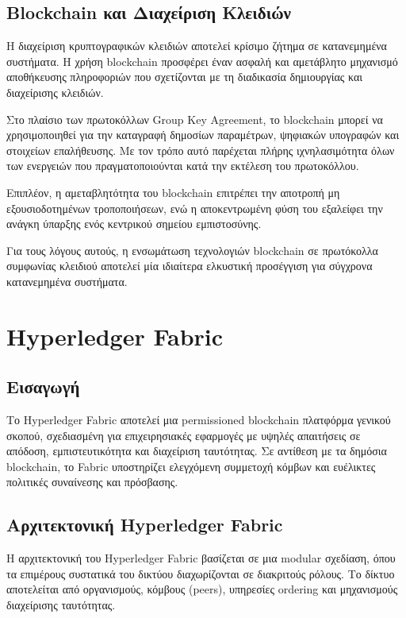 \documentclass[12pt,a4paper]{report}
\begin{document}
\section{Blockchain και Διαχείριση Κλειδιών}

Η διαχείριση κρυπτογραφικών κλειδιών αποτελεί κρίσιμο ζήτημα σε κατανεμημένα συστήματα. Η χρήση blockchain προσφέρει έναν ασφαλή και αμετάβλητο μηχανισμό αποθήκευσης πληροφοριών που σχετίζονται με τη διαδικασία δημιουργίας και διαχείρισης κλειδιών.

Στο πλαίσιο των πρωτοκόλλων Group Key Agreement, το blockchain μπορεί να χρησιμοποιηθεί για την καταγραφή δημοσίων παραμέτρων, ψηφιακών υπογραφών και στοιχείων επαλήθευσης. Με τον τρόπο αυτό παρέχεται πλήρης ιχνηλασιμότητα όλων των ενεργειών που πραγματοποιούνται κατά την εκτέλεση του πρωτοκόλλου.

Επιπλέον, η αμεταβλητότητα του blockchain επιτρέπει την αποτροπή μη εξουσιοδοτημένων τροποποιήσεων, ενώ η αποκεντρωμένη φύση του εξαλείφει την ανάγκη ύπαρξης ενός κεντρικού σημείου εμπιστοσύνης.

Για τους λόγους αυτούς, η ενσωμάτωση τεχνολογιών blockchain σε πρωτόκολλα συμφωνίας κλειδιού αποτελεί μία ιδιαίτερα ελκυστική προσέγγιση για σύγχρονα κατανεμημένα συστήματα.

\chapter{Hyperledger Fabric}

\section{Εισαγωγή}

Το Hyperledger Fabric αποτελεί μια permissioned blockchain πλατφόρμα γενικού σκοπού, σχεδιασμένη για επιχειρησιακές εφαρμογές με υψηλές απαιτήσεις σε απόδοση, εμπιστευτικότητα και διαχείριση ταυτότητας. Σε αντίθεση με τα δημόσια blockchain, το Fabric υποστηρίζει ελεγχόμενη συμμετοχή κόμβων και ευέλικτες πολιτικές συναίνεσης και πρόσβασης.

\section{Αρχιτεκτονική Hyperledger Fabric}

Η αρχιτεκτονική του Hyperledger Fabric βασίζεται σε μια modular σχεδίαση, όπου τα επιμέρους συστατικά του δικτύου διαχωρίζονται σε διακριτούς ρόλους. Το δίκτυο αποτελείται από οργανισμούς, κόμβους (peers), υπηρεσίες ordering και μηχανισμούς διαχείρισης ταυτότητας.
\end{document}
